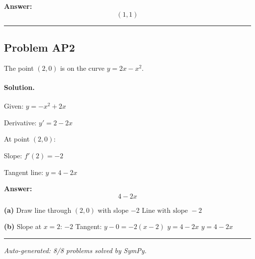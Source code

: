 \documentclass[12pt, a4paper]{article}
\newcommand{\problem}[1]{\subsection*{Problem #1}}
\newcommand{\solution}{\paragraph{Solution.}}
\begin{document}
\textbf{Answer:}
\[\boxed{(1, 1)}\]

\vspace{1em}
\hrule
\vspace{1em}

\problem{AP2}

The point $(2, 0)$ is on the curve $y = 2x - x^2$.

\solution

Given: $y = - x^{2} + 2 x$

Derivative: $y' = 2 - 2 x$

At point $(2, 0)$:

Slope: $f'(2) = -2$

Tangent line: $y = 4 - 2 x$

\textbf{Answer:}
\[\boxed{4 - 2 x}\]

\textbf{(a)}
Draw line through $(2, 0)$ with slope $-2$
$\boxed{\text{Line with slope } -2}$

\textbf{(b)}
Slope at $x=2$: $-2$
Tangent: $y - 0 = -2(x - 2)$
$y = 4 - 2 x$
$\boxed{y = 4 - 2 x}$

\vspace{1em}
\hrule
\vspace{1em}


\vspace{2em}
\noindent\textit{Auto-generated: 8/8 problems solved by SymPy.}
\end{document}

